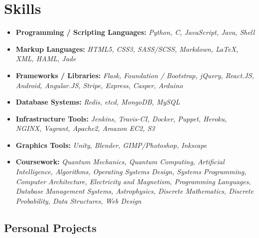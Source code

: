 \documentclass[12pt,a4paper,sans]{moderncv}
\begin{document}
\section{Skills}

\begin{itemize}

\item{\textbf{Programming / Scripting Languages:} \textit{Python, C, JavaScript, Java, Shell}}
\vspace{3pt}

\item{\textbf{Markup Languages:}\textit{ HTML5, CSS3, SASS/SCSS, Markdown, LaTeX, XML, HAML, Jade }}
\vspace{3pt}

\item{\textbf{Frameworks / Libraries:}\textit{ Flask, Foundation / Bootstrap, jQuery, React.JS, Android, Angular.JS, Stripe, Express, Casper, Arduino}}
\vspace{3pt}

\item{\textbf{Database Systems:}\textit{ Redis, etcd, MongoDB, MySQL}}
\vspace{3pt}

\item{\textbf{Infrastructure Tools:}\textit{ Jenkins, Travis-CI, Docker, Puppet, Heroku, NGINX, Vagrant, Apache2, Amazon EC2, S3}}
\vspace{3pt}

\item{\textbf{Graphics Tools:}\textit{ Unity, Blender, GIMP/Photoshop, Inkscape}}
\vspace{3pt}

\item{\textbf{Coursework:}\textit{ Quantum Mechanics, Quantum Computing, Artificial Intelligence, Algorithms, Operating Systems Design, Systems Programming, Computer Architecture, Electricity and Magnetism, Programming Languages, Database Management Systems, Astrophysics, Discrete Mathematics, Discrete Probability, Data Structures, Web Design}}

\end{itemize}


\subsection{Personal Projects}
\vspace{5pt}
\end{document}
